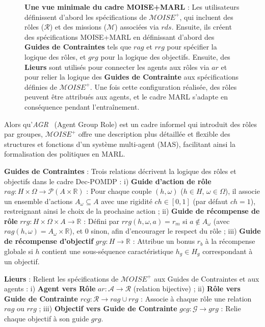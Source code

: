 \documentclass[final]{jfsma}
\begin{document}
\begin{figure}[h!]

  \caption{\textbf{Une vue minimale du cadre MOISE+MARL} :
    Les utilisateurs définissent d'abord les spécifications de \(\mathcal{M}OISE^+\), qui incluent des rôles (\(\mathcal{R}\)) et des missions (\(\mathcal{M}\)) associées via \(rds\). Ensuite, ils créent des spécifications MOISE+MARL en définissant d'abord des \textbf{Guides de Contraintes} tels que \(rag\) et \(rrg\) pour spécifier la logique des rôles, et \(grg\) pour la logique des objectifs.
    Ensuite, des \textbf{Lieurs} sont utilisés pour connecter les agents aux rôles via \(ar\) et pour relier la logique des \textbf{Guides de Contrainte} aux spécifications définies de \(\mathcal{M}OISE^+\). Une fois cette configuration réalisée, des rôles peuvent être attribués aux agents, et le cadre MARL s'adapte en conséquence pendant l'entraînement.
  }
  \label{fig:mm_synthesis}
\end{figure}

Alors qu'\textit{AGR}~\cite{ferber2003} (Agent Group Role) est un cadre informel qui introduit des rôles par groupes, \(\mathcal{M}OISE^+\) offre une description plus détaillée et flexible des structures et fonctions d'un système multi-agent (MAS), facilitant ainsi la formalisation des politiques en MARL.

\medskip
\noindent \textbf{Guides de Contraintes} : Trois relations décrivent la logique des rôles et objectifs dans le cadre Dec-POMDP :
i) \textbf{Guide d'action de rôle} \(rag: H \times \Omega \to \mathcal{P}(A \times \mathbb{R})\) : Pour chaque couple \((h,\omega)\) (\(h\in H\), \(\omega\in \Omega\)), il associe un ensemble d'actions \(A_\omega \subseteq A\) avec une rigidité \(ch \in [0,1]\) (par défaut \(ch=1\)), restreignant ainsi le choix de la prochaine action ; \quad
ii) \textbf{Guide de récompense de rôle} \(rrg: H \times \Omega \times A \to \mathbb{R}\) : Défini par \(rrg(h,\omega,a)=r_m\) si \(a \notin A_\omega\) (avec \(rag(h,\omega)=A_\omega \times \mathbb{R}\)), et 0 sinon, afin d'encourager le respect du rôle ; \quad
iii) \textbf{Guide de récompense d'objectif} \(grg: H \to \mathbb{R}\) : Attribue un bonus \(r_b\) à la récompense globale si \(h\) contient une sous-séquence caractéristique \(h_g \in H_g\) correspondant à un objectif.

\medskip
\noindent \textbf{Lieurs} : Relient les spécifications de \(\mathcal{M}OISE^+\) aux Guides de Contraintes et aux agents :
i) \textbf{Agent vers Rôle} \(ar: \mathcal{A} \to \mathcal{R}\) (relation bijective) ; \quad
ii) \textbf{Rôle vers Guide de Contrainte} \(rcg: \mathcal{R} \to rag \cup rrg\) : Associe à chaque rôle une relation \(rag\) ou \(rrg\) ; \quad
iii) \textbf{Objectif vers Guide de Contrainte} \(gcg: \mathcal{G} \to grg\) : Relie chaque objectif à son guide \(grg\).
\end{document}
